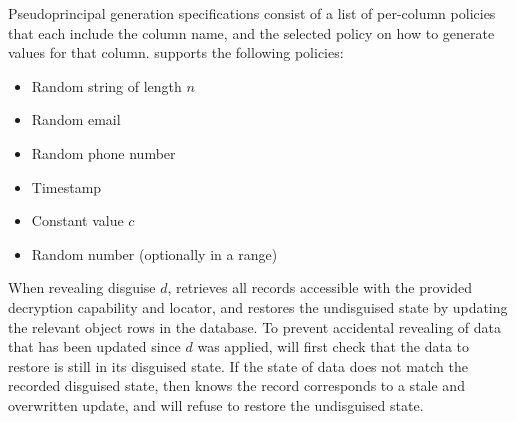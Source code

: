 Pseudoprincipal generation specifications consist of a list of per-column policies that each
include the column name, and the selected policy on how to generate values for that column.
\sys supports the following policies:
\begin{itemize}[nosep]
    \item Random string of length $n$
    \item Random email
    \item Random phone number
    \item Timestamp
    \item Constant value $c$
    \item Random number (optionally in a range)
\end{itemize}

When revealing disguise $d$, \sys retrieves all records accessible with the provided decryption capability
and locator, and restores the undisguised state by updating the relevant object rows in the database.
To prevent accidental revealing of data that has been updated since $d$ was applied,
\sys will first check that the data to restore is still in its disguised state. If the state of data does
not match the recorded disguised state, then \sys knows the record corresponds to a stale and
overwritten update, and will refuse to restore the undisguised state.


